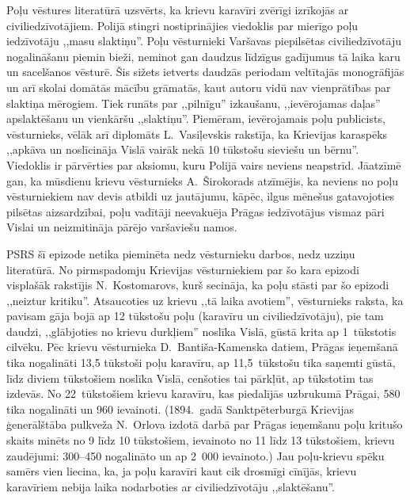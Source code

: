 \documentclass[twoside,a5paper,12pt,fleqn,openany]{extbook}
\begin{document}
Poļu vēstures literatūrā uzsvērts, ka krievu karavīri zvērīgi izrīkojās ar civiliedzīvotājiem. Polijā stingri nostiprinājies viedoklis par mierīgo poļu iedzīvotāju ,,masu slaktiņu''. Poļu vēsturnieki Varšavas piepilsētas civiliedzīvotāju nogalināšanu piemin bieži, neminot gan daudzus līdzīgus gadījumus tā laika karu un sacelšanos vēsturē. Šis sižets ietverts daudzās periodam veltītajās monogrāfijās un arī skolai domātās mācību grāmatās, kaut autoru vidū nav vienprātības par slaktiņa mērogiem. Tiek runāts par ,,pilnīgu'' izkaušanu, ,,ievērojamas daļas'' apslaktēšanu un vienkāršu ,,slaktiņu''. Piemēram, ievērojamais poļu publicists, vēsturnieks, vēlāk arī diplomāts L.~Vasiļevskis rakstīja, ka Krievijas karaspēks ,,apkāva un noslīcināja Vislā vairāk nekā 10 tūkstošu sieviešu un bērnu''. Viedoklis ir pārvērties par aksiomu, kuru Polijā vairs neviens neapstrīd. Jāatzīmē gan, ka mūsdienu krievu vēsturnieks A.~Širokorads atzīmējis, ka neviens no poļu vēsturniekiem nav devis atbildi uz jautājumu, kāpēc, ilgus mēnešus gatavojoties pilsētas aizsardzībai, poļu vadītāji neevakuēja Prāgas iedzīvotājus vismaz pāri Vislai un neizmitināja pārējo varšaviešu namos.

PSRS šī epizode netika pieminēta nedz vēsturnieku darbos, nedz uzziņu literatūrā. No pirmspadomju Krievijas vēsturniekiem par šo kara epizodi visplašāk rakstījis N.~Kostomarovs, kurš secināja, ka poļu stāsti par šo epizodi ,,neiztur kritiku''. Atsaucoties uz krievu ,,tā laika avotiem'', vēsturnieks raksta, ka pavisam gāja bojā ap 12 tūkstošu poļu (karavīru un civiliedzīvotāju), pie tam daudzi, ,,glābjoties no krievu durkļiem'' noslīka Vislā, gūstā krita ap 1~tūkstotis cilvēku. Pēc krievu vēsturnieka D.~Bantiša-Kamenska datiem, Prāgas ieņemšanā tika nogalināti 13,5 tūkstoši poļu karavīru, ap 11,5~tūkstošu tika saņemti gūstā, līdz diviem tūkstošiem noslīka Vislā, cenšoties tai pārkļūt, ap tūkstotim tas izdevās. No 22~tūkstošiem krievu karavīru, kas piedalījās uzbrukumā Prāgai, 580 tika nogalināti un 960 ievainoti. (1894.~gadā Sanktpēterburgā Krievijas ģenerālštāba pulkveža N.~Orlova izdotā darbā par Prāgas ieņemšanu poļu kritušo skaits minēts no 9 līdz 10 tūkstošiem, ievainoto no 11 līdz 13 tūkstošiem, krievu zaudējumi: 300--450 nogalināto un ap 2~000 ievainoto.) Jau poļu-krievu spēku samērs vien liecina, ka, ja poļu karavīri kaut cik drosmīgi cīnījās, krievu karavīriem nebija laika nodarboties ar civiliedzīvotāju ,,slaktēšanu''.
\end{document}
